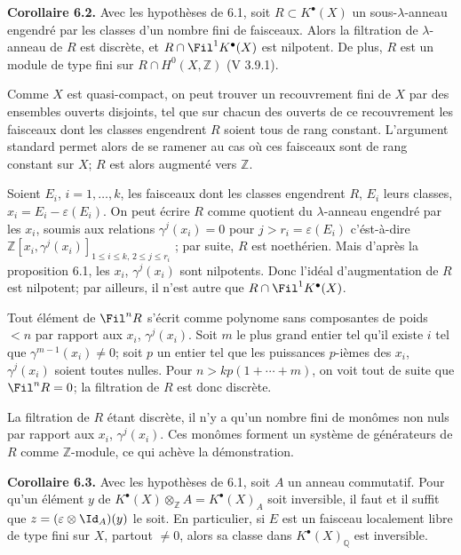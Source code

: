 \textbf{Corollaire 6.2.} Avec les hypothèses de 6.1, soit $R\subset K^{\bullet}(X)$ un sous-$\lambda$-anneau engendré par les classes d'un nombre fini de faisceaux. Alors la filtration de $\lambda$-anneau de $R$ est discrète, et $R\cap\Fil^1K^{\bullet}(X)$ est nilpotent. De plus, $R$ est un module de type fini sur $R\cap H^0(X,\mathbb Z)$ (V 3.9.1).

Comme $X$ est quasi-compact, on peut trouver un recouvrement fini de $X$ par des ensembles ouverts disjoints, tel que sur chacun des ouverts de ce recouvrement les faisceaux dont les classes engendrent $R$ soient tous de rang constant. L'argument standard permet alors de se ramener au cas où ces faisceaux sont de rang constant sur $X$; $R$ est alors augmenté vers $\mathbb Z$.

Soient $E_i$, $i=1,\ldots,k$, les faisceaux dont les classes engendrent $R$, $E_i$ leurs classes, $x_i=E_i-\varepsilon(E_i)$. On peut écrire $R$ comme quotient du $\lambda$-anneau engendré par les $x_i$, soumis aux relations $\gamma^j(x_i)=0$ pour $j>r_i=\varepsilon(E_i)$ c'ést-à-dire $\mathbb Z[x_i,\gamma^j(x_i)]_{1\le i\le k,\,2\le j\le r_i}$ ; par suite, $R$ est noethérien. Mais d'après la proposition 6.1, les $x_i$, $\gamma^j(x_i)$ sont nilpotents. Donc l'idéal d'augmentation de $R$ est nilpotent; par ailleurs, il n'est autre que $R\cap\Fil^1K^{\bullet}(X)$.

Tout élément de $\Fil^n R$ s'écrit comme polynome sans composantes de poids $<n$ par rapport aux $x_i$, $\gamma^j(x_i)$. Soit $m$ le plus grand entier tel qu'il existe $i$ tel que $\gamma^{m-1}(x_i)\ne0$; soit $p$ un entier tel que les puissances $p$-ièmes des $x_i$, $\gamma^j(x_i)$ soient toutes nulles. Pour $n>kp(1+\cdots+m)$, on voit tout de suite que $\Fil^nR=0$; la filtration de $R$ est donc discrète.

La filtration de $R$ étant discrète, il n'y a qu'un nombre fini de monômes non nuls par rapport aux $x_i$, $\gamma^j(x_i)$. Ces monômes forment un système de générateurs de $R$ comme $\mathbb Z$-module, ce qui achève la démonstration.

\textbf{Corollaire 6.3.} Avec les hypothèses de 6.1, soit $A$ un anneau commutatif. Pour qu'un élément $y$ de $K^{\bullet}(X)\otimes_{\mathbb Z}A=K^{\bullet}(X)_A$ soit inversible, il faut et il suffit que $z=(\varepsilon\otimes\Id_A)(y)$ le soit. En particulier, si $E$ est un faisceau localement libre de type fini sur $X$, partout $\ne0$, alors sa classe dans $K^{\bullet}(X)_{\mathbb Q}$ est inversible.

